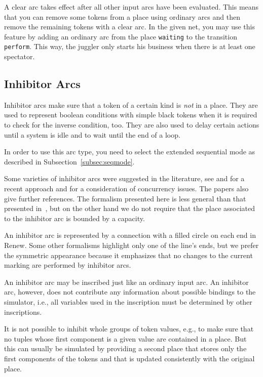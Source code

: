 A clear arc takes effect after all other input arcs have been evaluated.
This means that you can remove some tokens from a
place using ordinary arcs and then remove the remaining tokens
with a clear arc. In the given net, you may use this feature
by adding an ordinary arc from the place \texttt{waiting}
to the transition \texttt{perform}. This way, the juggler only
starts his business when there is at least one spectator.



\subsection{Inhibitor Arcs}\label{subsec:inhibArcs}

Inhibitor arcs make sure that a token of
a certain kind is \emph{not} in a place. They are used
to represent boolean conditions with simple black tokens
when it is required to check for the inverse condition, too.
They are also used to delay certain actions until
a system is idle and to wait until the end of a loop.

In order to use this arc type, you need to select the
extended sequential mode as described in
Subsection~\ref{subsec:seqmode}.

Some varieties of inhibitor arcs were suggested in the literature,
see \cite{CDH93} and \cite{LC94} for a
recent approach and \cite{CDF91} for a consideration
of concurrency issues. The papers also give
further references. The formalism presented here is less
general than that presented in~\cite{CDH93}, but
on the other hand we do not require
that the place associated to the inhibitor arc is bounded
by a capacity.

An inhibitor arc is represented by a connection with
a filled circle on each end in Renew. Some other formalisms
highlight only one of the line's ends, but we prefer
the symmetric appearance because it emphasizes that no changes
to the current marking are performed by inhibitor arcs.

An inhibitor arc may be inscribed just like an ordinary
input arc. An inhibitor arc, however, does not contribute
any information about possible bindings to the simulator,
i.e., all variables used in the inscription must be
determined by other inscriptions.

It is not possible to inhibit whole groups of token values, e.g.,
to make sure that no tuples whose first component is
a given value are contained in a place. But this can usually be
simulated by providing a second place that stores only
the first components of the tokens and that is updated
consistently with the original place.

